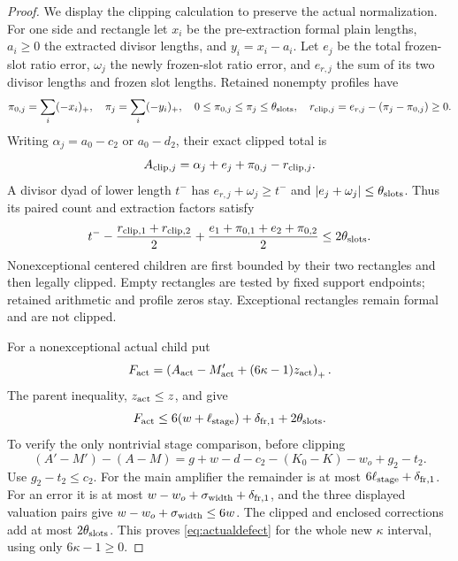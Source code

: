 \begin{proof}
We display the clipping calculation to preserve the actual normalization. For one side and rectangle let $x_i$ be the pre-extraction formal plain lengths, $a_i\ge0$ the extracted divisor lengths, and $y_i=x_i-a_i$. Let $e_j$ be the total frozen-slot ratio error, $\omega_j$ the newly frozen-slot ratio error, and $e_{r,j}$ the sum of its two divisor lengths and frozen slot lengths. Retained nonempty profiles have
\[
 \pi_{0,j}=\sum_i(-x_i)_+,\quad \pi_j=\sum_i(-y_i)_+,\quad
 0\le\pi_{0,j}\le\pi_j\le\theta_{\rm slots},\quad
 r_{{\rm clip},j}=e_{r,j}-(\pi_j-\pi_{0,j})\ge0.
\]
Writing $\alpha_j=a_0-c_2$ or $a_0-d_2$, their exact clipped total is
\[
 A_{{\rm clip},j}=\alpha_j+e_j+\pi_{0,j}-r_{{\rm clip},j}.
\]
A divisor dyad of lower length $t^-$ has $e_{r,j}+\omega_j\ge t^-$ and $|e_j+\omega_j|\le\theta_{\rm slots}$. Thus its paired count and extraction factors satisfy
\[
 t^- -\frac{r_{{\rm clip},1}+r_{{\rm clip},2}}2
       +\frac{e_1+\pi_{0,1}+e_2+\pi_{0,2}}2\le2\theta_{\rm slots}.
\]
Nonexceptional centered children are first bounded by their two rectangles and then legally clipped. Empty rectangles are tested by fixed support endpoints; retained arithmetic and profile zeros stay. Exceptional rectangles remain formal and are not clipped.

For a nonexceptional actual child put
\[
 F_{\rm act}=\left(A_{\rm act}-M'_{\rm act}+(6\kappa-1)z_{\rm act}\right)_+.
\]
The parent inequality, $z_{\rm act}\le z$, and  give
\begin{equation}\label{eq:actualdefect}
 F_{\rm act}\le6(w+\ell_{\rm stage})+\delta_{{\rm fr},1}+2\theta_{\rm slots}.
\end{equation}
To verify the only nontrivial stage comparison, before clipping
\[
 (A'-M')-(A-M)
 =g+w-d-c_2-(K_0-K)-w_o+g_2-t_2.
\]
Use $g_2-t_2\le c_2$. For the main amplifier the remainder is at most $6\ell_{\rm stage}+\delta_{{\rm fr},1}$. For an error it is at most $w-w_o+\sigma_{\rm width}+\delta_{{\rm fr},1}$, and the three displayed valuation pairs give $w-w_o+\sigma_{\rm width}\le6w$. The clipped and enclosed corrections add at most $2\theta_{\rm slots}$. This proves \eqref{eq:actualdefect} for the whole new $\kappa$ interval, using only $6\kappa-1\ge0$.


\end{proof}
